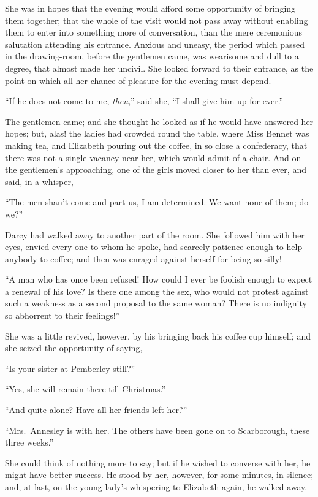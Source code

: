 She was in hopes that the evening would afford some
opportunity of bringing them together; that the whole
of the visit would not pass away without enabling them
to enter into something more of conversation, than the
mere ceremonious salutation attending his entrance.
Anxious and uneasy, the period which passed in the
drawing-room, before the gentlemen came, was wearisome
and dull to a degree, that almost made her uncivil. She
looked forward to their entrance, as the point on
which all her chance of pleasure for the evening must
depend.

“If he does not come to me, \textit{then},” said she, “I shall
give him up for ever.”

The gentlemen came; and she thought he looked as
if he would have answered her hopes; but, alas! the
ladies had crowded round the table, where Miss Bennet
was making tea, and Elizabeth pouring out the coffee, in
so close a confederacy, that there was not a single vacancy
near her, which would admit of a chair. And on the
gentlemen’s approaching, one of the girls moved closer
to her than ever, and said, in a whisper,

“The men shan’t come and part us, I am determined.
We want none of them; do we?”

Darcy had walked away to another part of the room.
She followed him with her eyes, envied every one to whom
he spoke, had scarcely patience enough to help anybody
to coffee; and then was enraged against herself for being
so silly!

“A man who has once been refused! How could I ever
be foolish enough to expect a renewal of his love? Is there
one among the sex, who would not protest against such
a weakness as a second proposal to the same woman?
There is no indignity so abhorrent to their feelings!”

She was a little revived, however, by his bringing back
his coffee cup himself; and she seized the opportunity
of saying,

“Is your sister at Pemberley still?”

“Yes, she will remain there till Christmas.”

“And quite alone? Have all her friends left her?”

“Mrs.\ Annesley is with her. The others have been gone
on to Scarborough, these three weeks.”

She could think of nothing more to say; but if he
wished to converse with her, he might have better success.
He stood by her, however, for some minutes, in silence;
and, at last, on the young lady’s whispering to Elizabeth
again, he walked away.

